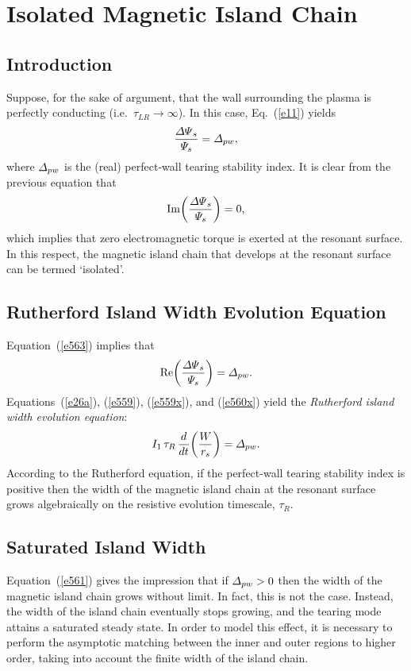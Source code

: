\documentclass[12pt,prb,aps]{revtex4-1}
\begin{document}
\section{Isolated Magnetic Island Chain}
\subsection{Introduction}
Suppose, for the sake of argument,  that the wall surrounding the plasma is perfectly conducting (i.e.\, $\tau_{LR}\rightarrow\infty$). In this case, Eq.~(\ref{e11}) yields 
\begin{equation}\label{e563}
\frac{{\mit\Delta\Psi}_s}{{\mit\Psi}_s} ={\mit\Delta}_{pw},
\end{equation}
where ${\mit\Delta}_{pw}$ is the (real) perfect-wall tearing stability index. It is clear from the previous equation that
\begin{equation}\label{e559x}
{\rm Im}\!\left(\frac{{\mit\Delta\Psi}_s}{{\mit\Psi}_s}\right) = 0,
\end{equation}
which implies that zero electromagnetic torque is exerted at the resonant surface. In this respect, the magnetic island chain that develops at the resonant surface can be termed `isolated'. 

\subsection{Rutherford Island Width Evolution Equation}
Equation~(\ref{e563}) implies that 
\begin{equation}\label{e560x}
{\rm Re}\!\left(\frac{{\mit\Delta\Psi}_s}{{\mit\Psi}_s}\right) = {\mit\Delta}_{pw}.
\end{equation}
Equations~(\ref{e26a}), (\ref{e559}), (\ref{e559x}), and (\ref{e560x}) yield the {\em Rutherford island width evolution equation}:\,\cite{rutherford}
\begin{equation}\label{e561}
I_1\,\tau_R\,\frac{d}{dt}\!\left(\frac{W}{r_s}\right)= {\mit\Delta}_{pw}.
\end{equation}
 According to the Rutherford equation, if the perfect-wall tearing stability index is positive then the width of the magnetic
island chain at the resonant surface grows  algebraically on the resistive evolution timescale, $\tau_R$. 

\subsection{Saturated Island Width}\label{sat}
Equation~(\ref{e561}) gives the impression that if ${\mit\Delta}_{pw}>0$ then the width of the magnetic island chain 
grows without limit. In fact, this is not the case. Instead, the width of the island chain eventually stops growing, and the
tearing mode attains a saturated steady state. In order to model this effect, it is necessary to perform the
asymptotic matching between the inner and outer regions to higher order, taking into account the finite
width of the island chain.\cite{white,thy,esc,mit}
\end{document}
